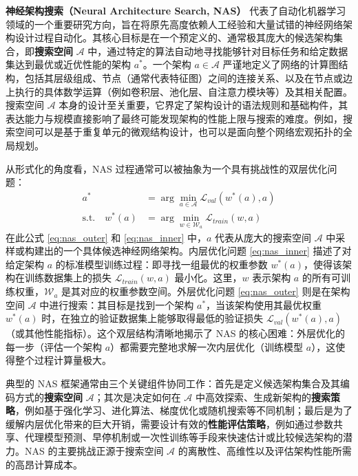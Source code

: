 \documentclass[../main.tex]{subfiles}
\begin{document}

\textbf{神经架构搜索（Neural Architecture Search, NAS）} 代表了自动化机器学习领域的一个重要研究方向，旨在将原先高度依赖人工经验和大量试错的神经网络架构设计过程自动化。其核心目标是在一个预定义的、通常极其庞大的候选架构集合，即\textbf{搜索空间} $\mathcal{A}$ 中，通过特定的算法自动地寻找能够针对目标任务和给定数据集达到最优或近优性能的架构 $a^*$。一个架构 $a \in \mathcal{A}$ 严谨地定义了网络的计算图结构，包括其层级组成、节点（通常代表特征图）之间的连接关系、以及在节点或边上执行的具体数学运算（例如卷积层、池化层、自注意力模块等）及其相关配置。搜索空间 $\mathcal{A}$ 本身的设计至关重要，它界定了架构设计的语法规则和基础构件，其表达能力与规模直接影响了最终可能发现架构的性能上限与搜索的难度。例如，搜索空间可以是基于重复单元的微观结构设计，也可以是面向整个网络宏观拓扑的全局规划。

从形式化的角度看，NAS 过程通常可以被抽象为一个具有挑战性的双层优化问题：
\begin{align}
	a^{*}                      & = \arg\min_{a \in \mathcal{A}} \mathcal{L}_{val}(w^{*}(a), a) \label{eq:nas_outer} \\
	\text{s.t.} \quad w^{*}(a) & = \arg\min_{w \in \mathcal{W}_a} \mathcal{L}_{train}(w, a) \label{eq:nas_inner}
\end{align}
在此公式 \eqref{eq:nas_outer} 和 \eqref{eq:nas_inner} 中，$a$ 代表从庞大的搜索空间 $\mathcal{A}$ 中采样或构建出的一个具体候选神经网络架构。内层优化问题 \eqref{eq:nas_inner} 描述了对给定架构 $a$ 的标准模型训练过程：即寻找一组最优的权重参数 $w^{*}(a)$，使得该架构在训练数据集上的损失 $\mathcal{L}_{train}(w, a)$ 最小化。这里，$w$ 表示架构 $a$ 的所有可训练权重，$\mathcal{W}_a$ 是其对应的权重参数空间。外层优化问题 \eqref{eq:nas_outer} 则是在架构空间 $\mathcal{A}$ 中进行搜索：其目标是找到一个架构 $a^*$，当该架构使用其最优权重 $w^*(a)$ 时，在独立的验证数据集上能够取得最低的验证损失 $\mathcal{L}_{val}(w^{*}(a), a)$（或其他性能指标）。这个双层结构清晰地揭示了 NAS 的核心困难：外层优化的每一步（评估一个架构 $a$）都需要完整地求解一次内层优化（训练模型 $a$），这使得整个过程计算量极大。

典型的 NAS 框架通常由三个关键组件协同工作：首先是定义候选架构集合及其编码方式的\textbf{搜索空间} $\mathcal{A}$；其次是决定如何在 $\mathcal{A}$ 中高效探索、生成新架构的\textbf{搜索策略}，例如基于强化学习、进化算法、梯度优化或随机搜索等不同机制；最后是为了缓解内层优化带来的巨大开销，需要设计有效的\textbf{性能评估策略}，例如通过参数共享、代理模型预测、早停机制或一次性训练等手段来快速估计或比较候选架构的潜力。NAS 的主要挑战正源于搜索空间 $\mathcal{A}$ 的离散性、高维性以及评估架构性能所需的高昂计算成本。
\end{document}
